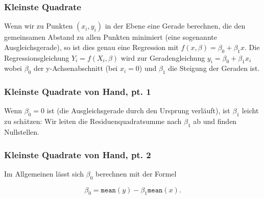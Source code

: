 \begin{frame}
\frametitle{Kleinste Quadrate}
Wenn wir zu Punkten $(x_i,y_i)$ in der Ebene eine Gerade berechnen,
die den gemeinsamen Abstand zu allen Punkten minimiert (eine sogenannte Ausgleichsgerade),
so ist dies genau eine Regression mit $f(x, \beta) = \beta_0 + \beta_1 x$.
Die Regressionsgleichung $Y_i = f(X_i, \beta)$ wird zur Geradengleichung
$y_i = \beta_0 + \beta_1 x_i$
wobei $\beta_0$ der y-Achsenabschnitt (bei $x_i=0$) und $\beta_1$ die Steigung der Geraden ist.

\vspace{0.5cm}

\end{frame}

\begin{frame}
\frametitle{Kleinste Quadrate von Hand, pt. 1}
Wenn $\beta_0 = 0$ ist (die Ausgleichsgerade durch den Ursprung verläuft), ist $\beta_1$ leicht zu schätzen:
Wir leiten die Residuenquadratsumme nach $\beta_1$ ab und finden Nullstellen.

\end{frame}

\begin{frame}
\frametitle{Kleinste Quadrate von Hand, pt. 2}
Im Allgemeinen lässt sich $\beta_0$ berechnen mit der Formel

$$
\beta_0 = \texttt{mean}(y) - \beta_1\texttt{mean}(x).
$$

\vspace{0.5cm}

\end{frame}

